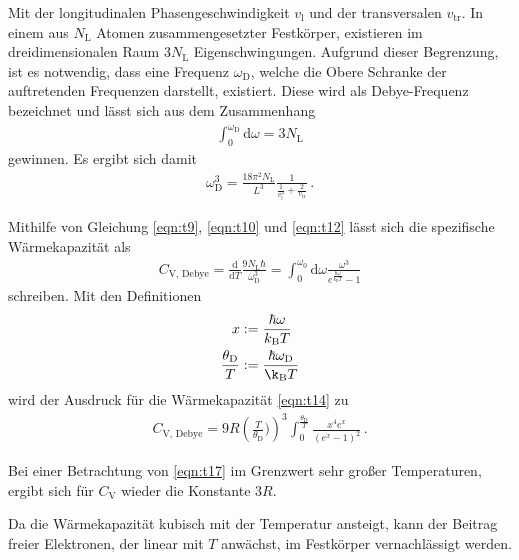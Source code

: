 Mit der longitudinalen Phasengeschwindigkeit $v_{\text{l}}$
und der transversalen $v_{\text{tr}}$.
In einem aus $N_{\text{L}}$ Atomen zusammengesetzter Festkörper,
existieren im dreidimensionalen Raum $3N_{\text{L}}$ Eigenschwingungen.
Aufgrund dieser Begrenzung, ist es notwendig, dass eine
Frequenz $\omega_{\text{D}}$, welche die Obere Schranke der auftretenden
Frequenzen darstellt, existiert.
Diese wird als Debye-Frequenz bezeichnet und lässt sich
aus dem Zusammenhang
\begin{align}
	\int_{0}^{\omega_{\text{D}}} \mathrm{d}\omega = 3 N_{\text{L}} \label{eqn:t11}
\end{align}
gewinnen.
Es ergibt sich damit
\begin{align}
	\omega_{\text{D}}^{3} = \frac{18 \pi^{2} N_{\text{L}}}{L^{3}}
	\frac{1}{\frac{1}{v_{\text{l}}^{3}} + \frac{2}{v_{\text{tr}}}} \, .\label{eqn:t12}
\end{align}

Mithilfe von Gleichung \ref{eqn:t9}, \ref{eqn:t10} und \ref{eqn:t12}
lässt sich die spezifische Wärmekapazität als
\begin{align}
	C_{\text{V, Debye}} = \frac{\mathrm{d}}{\mathrm{d}T} \frac{9 N_{\text{L}} \hbar}{\omega_{\text{D}}^{3}}
	= \int_{0}^{\omega_{0}} \mathrm{d}\omega \frac{\omega^{3}}{e^{\frac{\hbar \omega}{k_{\text{B}} T}} - 1} \label{eqn:t14}
\end{align}
schreiben.
Mit den Definitionen
\begin{align*}
	x &:= \frac{\hbar \omega}{k_{\text{B}} T}\\
	\frac{\theta_{\text{D}}}{T} &:= \frac{\hbar \omega_{\text{D}}}{\k_{\text{B}} T}
\end{align*}
wird der Ausdruck für die Wärmekapazität \ref{eqn:t14} zu
\begin{align}
	C_{\text{V, Debye}} = 9 R \left(\frac{T}{\theta_{\text{D}}})\right)^{3}
	\int_{0}^{\frac{\theta_{\text{D}}}{T}} \frac{x^{4} e^{x}}{\left( e^{x} - 1 \right)^{2}} \, . \label{eqn:t17}
\end{align}

Bei einer Betrachtung von \ref{eqn:t17} im Grenzwert sehr großer Temperaturen,
ergibt sich für $C_{\text{V}}$ wieder die Konstante $3R$.

Da die Wärmekapazität kubisch mit der Temperatur ansteigt, kann der Beitrag freier Elektronen, der linear mit $T$ anwächst, im Festkörper vernachlässigt werden.



\cite{sample}
